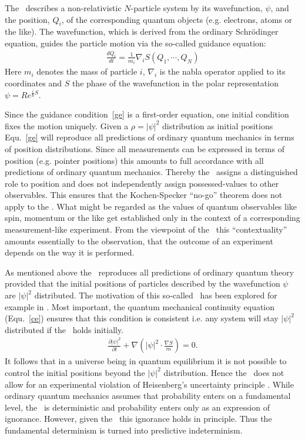 The \dbb\ describes a non-relativistic $N$-particle system by its wavefunction, $\psi$, and the position, $Q_i$, of the  corresponding
quantum objects (e.g. electrons, atoms or the like).
The wavefunction, which is derived from the ordinary Schr\"odinger equation, guides the particle motion 
via the so-called guidance equation:
\begin{eqnarray}  
\label{ge}
\frac{dQ_i}{dt}=\frac{1}{m_i}\nabla_i S(Q_1,\cdots,Q_N)
\end{eqnarray}
Here $m_i$ denotes the mass of particle $i$, $\nabla_i$ is the nabla operator applied to its 
coordinates and $S$ the phase of the wavefunction in the polar representation $\psi=Re^{\frac{i}{\hbar}S}$. 

Since the guidance condition~\ref{ge} is a first-order equation, one initial condition fixes the motion uniquely.
Given a $\rho=|\psi|^2$ distribution as initial positions Equ.~\ref{ge} will reproduce all
predictions of ordinary quantum mechanics in terms of position distributions. Since all measurements can be 
expressed in terms of position (e.g. pointer positions) this amounts to full accordance with all predictions of
ordinary quantum mechanics.  Thereby the \dbb\ assigns a distinguished role to position and does not independently 
assign possessed-values to other observables. This ensures that the Kochen-Specker ``no-go'' theorem does not apply to the \dbb. 
What might be regarded as the values of quantum observables like spin, momentum or the like get established only in the context of 
a corresponding measurement-like experiment. From the viewpoint of the \dbb\ this ``contextuality'' amounts essentially to the 
observation, that the outcome of an experiment depends on the way it is performed. 


As mentioned above the \dbb\ reproduces all predictions of ordinary quantum theory 
provided that the initial positions of particles described by the wavefunction $\psi$ are 
$|\psi|^2$ distributed. The motivation of this so-called \qeh\ has been explored for example in \cite{dgz,valentini}. 
Most important, the quantum mechanical continuity equation (Equ.~\ref{ce}) ensures that this condition is 
consistent i.e. any system will stay $|\psi|^2$ distributed if the \qeh\ holds initially. 
\begin{eqnarray}
\label{ce}
\frac{\partial |\psi|^2 }{\partial t}+\nabla  \left ( |\psi|^2 \cdot \frac{\nabla S}{m} \right ) = 0.
\end{eqnarray}
It follows that in a universe being in quantum equilibrium it is not possible to control the initial positions beyond the  
$|\psi|^2$ distribution. Hence the \dbb\  does not allow for an experimental
violation of Heisenberg's uncertainty principle \cite{valentini}.
While ordinary quantum mechanics assumes that probability enters on a fundamental level, the
\dbb\ is deterministic and probability enters only as an expression of ignorance. However, given the \qeh\ this ignorance
holds in principle. Thus the fundamental determinism is turned into predictive indeterminism.

